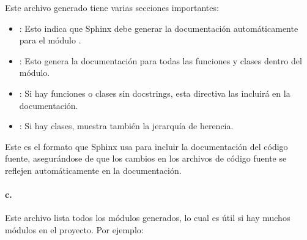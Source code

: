 \documentclass[a4paper,10pt,oneside,spanish,openany]{sphinxmanual}
\begin{document}
\sphinxAtStartPar
Este archivo generado tiene varias secciones importantes:
\begin{itemize}
\item {} 
\sphinxAtStartPar
{}: Esto indica que Sphinx debe generar la documentación automáticamente para el módulo .

\item {} 
\sphinxAtStartPar
{}: Esto genera la documentación para todas las funciones y clases dentro del módulo.

\item {} 
\sphinxAtStartPar
{}: Si hay funciones o clases sin docstrings, esta directiva las incluirá en la documentación.

\item {} 
\sphinxAtStartPar
{}: Si hay clases, muestra también la jerarquía de herencia.

\end{itemize}

\sphinxAtStartPar
Este es el formato que Sphinx usa para incluir la documentación del código fuente, asegurándose de que los cambios en los archivos de código fuente se reflejen automáticamente en la documentación.


\paragraph{c. }
\label{\detokenize{configuracion_inicial/007.Creacion_de_ficheros_de_codigo_y_generacion_automatica_de_documentacion:c-modules-rst-o-modules-md}}
\sphinxAtStartPar
Este archivo lista todos los módulos generados, lo cual es útil si hay muchos módulos en el proyecto. Por ejemplo:

\begin{sphinxVerbatim}[commandchars=\\\{\}]

 
    



\end{sphinxVerbatim}
\end{document}
